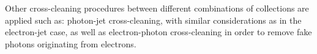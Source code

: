 Other cross-cleaning procedures between different combinations of collections are applied such as: photon-jet cross-cleaning, with similar considerations as in the electron-jet case, as well as electron-photon cross-cleaning in order to remove fake photons originating from electrons.

